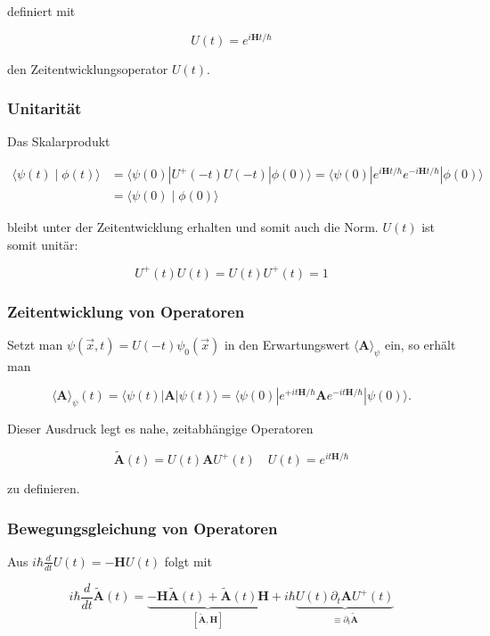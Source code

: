 \documentclass[10pt, letterpaper]{article}
\begin{document}
definiert mit

$$
U(t)=e^{i \mathbf{H} t / \hbar}
$$

den Zeitentwicklungsoperator $U(t)$.

\subsubsection*{Unitarität}
Das Skalarprodukt

$$
\begin{aligned}
\langle\psi(t) \mid \phi(t)\rangle & =\langle\psi(0)| U^{+}(-t) U(-t)|\phi(0)\rangle=\langle\psi(0)| e^{i \mathbf{H} t / \hbar} e^{-i \mathbf{H} t / \hbar}|\phi(0)\rangle \\
& =\langle\psi(0) \mid \phi(0)\rangle
\end{aligned}
$$

bleibt unter der Zeitentwicklung erhalten und somit auch die Norm. $U(t)$ ist somit unitär:

$$
U^{+}(t) U(t)=U(t) U^{+}(t)=1
$$

\subsubsection*{Zeitentwicklung von Operatoren}
Setzt man $\psi(\vec{x}, t)=U(-t) \psi_{0}(\vec{x})$ in den Erwartungswert $\langle\mathbf{A}\rangle_{\psi}$ ein, so erhält man

$$
\langle\mathbf{A}\rangle_{\psi}(t)=\langle\psi(t)| \mathbf{A}|\psi(t)\rangle=\langle\psi(0)| e^{+i t \mathbf{H} / \hbar} \mathbf{A} e^{-i t \mathbf{H} / \hbar}|\psi(0)\rangle .
$$

Dieser Ausdruck legt es nahe, zeitabhängige Operatoren

$$
\tilde{\mathbf{A}}(t)=U(t) \mathbf{A} U^{+}(t) \quad U(t)=e^{i t \mathbf{H} / \hbar}
$$

zu definieren.









\subsubsection*{Bewegungsgleichung von Operatoren}
Aus $i \hbar \frac{d}{d t} U(t)=-\mathbf{H} U(t)$ folgt mit

$$
i \hbar \frac{d}{d t} \tilde{\mathbf{A}}(t)=\underbrace{-\mathbf{H} \tilde{\mathbf{A}}(t)+\tilde{\mathbf{A}}(t) \mathbf{H}}_{[\tilde{\mathbf{A}}, \mathbf{H}]}+i \hbar \underbrace{U(t) \partial_{t} \mathbf{A} U^{+}(t)}_{\equiv \partial_{t} \tilde{\mathbf{A}}}
$$
\end{document}
